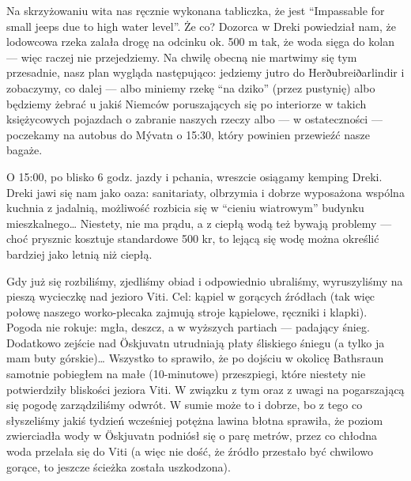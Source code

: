 
Na skrzyżowaniu wita nas ręcznie wykonana tabliczka, że  jest “Impassable for small jeeps due to high water level”. Że co? Dozorca w Dreki powiedział nam, że lodowcowa rzeka zalała drogę na odcinku ok. 500 m tak, że woda sięga do kolan --- więc raczej nie przejedziemy. Na chwilę obecną nie martwimy się tym przesadnie, nasz plan wygląda następująco: jedziemy jutro do Herðubreiðarlindir i zobaczymy, co dalej --- albo miniemy rzekę “na dziko” (przez pustynię) albo będziemy żebrać u jakiś Niemców poruszających się po interiorze w takich księżycowych pojazdach o zabranie naszych rzeczy albo --- w ostateczności --- poczekamy na autobus do Mývatn o 15:30, który powinien przewieźć nasze bagaże.

O 15:00, po blisko 6 godz. jazdy i pchania, wreszcie osiągamy kemping Dreki. Dreki jawi się nam jako oaza: sanitariaty, olbrzymia i dobrze wyposażona wspólna kuchnia z jadalnią, możliwość rozbicia się w “cieniu wiatrowym” budynku mieszkalnego… Niestety, nie ma prądu, a z ciepłą wodą też bywają problemy --- choć prysznic kosztuje standardowe 500 kr, to lejącą się wodę można określić bardziej jako letnią niż ciepłą.

Gdy już się rozbiliśmy, zjedliśmy obiad i odpowiednio ubraliśmy, wyruszyliśmy na pieszą wycieczkę nad jezioro Viti. Cel: kąpiel w gorących źródłach (tak więc połowę naszego worko-plecaka zajmują stroje kąpielowe, ręczniki i klapki). Pogoda nie rokuje: mgła, deszcz, a w wyższych partiach --- padający śnieg. Dodatkowo zejście nad Öskjuvatn utrudniają płaty śliskiego śniegu (a tylko ja mam buty górskie)… Wszystko to sprawiło, że po dojściu w okolicę Bathsraun samotnie pobiegłem na małe (10-minutowe) przeszpiegi, które niestety nie potwierdziły bliskości jeziora Viti. W związku z tym oraz z uwagi na pogarszającą się pogodę zarządziliśmy odwrót. W sumie może to i dobrze, bo z tego co słyszeliśmy jakiś tydzień wcześniej potężna lawina błotna sprawiła, że poziom zwierciadła wody w Öskjuvatn podniósł się o parę metrów, przez co chłodna woda przelała się do Viti (a więc nie dość, że źródło przestało być chwilowo gorące, to jeszcze ścieżka została uszkodzona).


